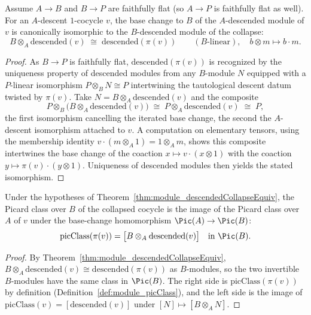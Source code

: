 \begin{theorem}
  \label{thm:module_descendedCollapseEquiv}
  \leanok
  Assume \(A \to B\) and \(B \to P\) are faithfully flat (so \(A \to P\) is faithfully flat as
  well).  For an \(A\)-descent \(1\)-cocycle \(v\), the base change to \(B\) of the
  \(A\)-descended module of \(v\) is canonically isomorphic to the \(B\)-descended module of the
  collapse:
  \[
    B \otimes_A \mathrm{descended}(v) \;\cong\; \mathrm{descended}(\pi(v))
    \qquad (B\text{-linear}),\quad b \otimes m \mapsto b \cdot m.
  \]
\end{theorem}
\begin{proof}
  \leanok
  As \(B \to P\) is faithfully flat, \(\mathrm{descended}(\pi(v))\) is recognized by the
  uniqueness property of descended modules from any \(B\)-module \(N\) equipped with a
  \(P\)-linear isomorphism \(P \otimes_B N \cong P\) intertwining the tautological descent datum
  twisted by \(\pi(v)\).  Take \(N = B \otimes_A \mathrm{descended}(v)\) and the composite
  \[
    P \otimes_B \bigl(B \otimes_A \mathrm{descended}(v)\bigr) \;\cong\; P \otimes_A
    \mathrm{descended}(v) \;\cong\; P,
  \]
  the first isomorphism cancelling the iterated base change, the second the \(A\)-descent
  isomorphism attached to \(v\).  A computation on elementary tensors, using the membership
  identity \(v \cdot (m \otimes_A 1) = 1 \otimes_A m\), shows this composite intertwines the
  base change of the coaction \(x \mapsto v \cdot (x \otimes 1)\) with the coaction \(y \mapsto
  \pi(v) \cdot (y \otimes 1)\).  Uniqueness of descended modules then yields the stated
  isomorphism.
\end{proof}

\begin{theorem}
  \label{thm:module_picClass_collapse}
  \leanok
  Under the hypotheses of Theorem~\ref{thm:module_descendedCollapseEquiv}, the Picard class over
  \(B\) of the collapsed cocycle is the image of the Picard class over \(A\) of \(v\) under the
  base-change homomorphism \(\Pic(A) \to \Pic(B)\):
  \[
    \mathrm{picClass}(\pi(v)) = \bigl[B \otimes_A \mathrm{descended}(v)\bigr] \quad\text{in }
    \Pic(B).
  \]
\end{theorem}
\begin{proof}
  \leanok
  By Theorem~\ref{thm:module_descendedCollapseEquiv}, \(B \otimes_A \mathrm{descended}(v) \cong
  \mathrm{descended}(\pi(v))\) as \(B\)-modules, so the two invertible \(B\)-modules have the
  same class in \(\Pic(B)\).  The right side is \(\mathrm{picClass}(\pi(v))\) by definition
  (Definition~\ref{def:module_picClass}), and the left side is the image of
  \(\mathrm{picClass}(v) = [\mathrm{descended}(v)]\) under \([N] \mapsto [B \otimes_A N]\).
\end{proof}

